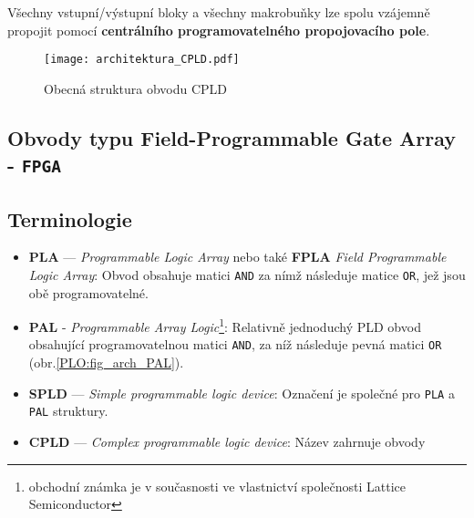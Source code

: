 {    Všechny vstupní/výstupní bloky a všechny makrobuňky lze spolu vzájemně propojit pomocí
    \textbf{centrálního programovatelného propojovacího pole}.

        \begin{figure}[ht!]
          \centering
          \texttt{[image: architektura\_CPLD.pdf]}
          \caption[Struktura obvodu CPLD]{Obecná struktura obvodu CPLD}
          \label{PLO:fig_arch_CPLD}
        \end{figure} 
           
  \subsection{Obvody typu Field-Programmable Gate Array - \texttt{FPGA}}   
    \subsection{Terminologie}
      \begin{itemize}
        \item \textbf{PLA} — \emph{Programmable Logic Array} nebo také \textbf{FPLA} \emph{Field
              Programmable Logic Array}: Obvod obsahuje matici \texttt{AND} za nímž následuje matice
              \texttt{OR}, jež jsou obě programovatelné.
        \item \textbf{PAL} - \emph{Programmable Array Logic}\footnote{obchodní známka je v
              současnosti ve vlastnictví společnosti Lattice Semiconductor}: Relativně jednoduchý
              PLD obvod obsahující programovatelnou matici \texttt{AND}, za níž následuje pevná
              matici \texttt{OR} (obr.\ref{PLO:fig_arch_PAL}). %
        \item \textbf{SPLD} — \emph{Simple programmable logic device}: Označení je společné pro   
              \texttt{PLA} a \texttt{PAL} struktury.
        \item \textbf{CPLD} — \emph{Complex programmable logic device}: Název zahrnuje obvody   

\end{itemize}}
